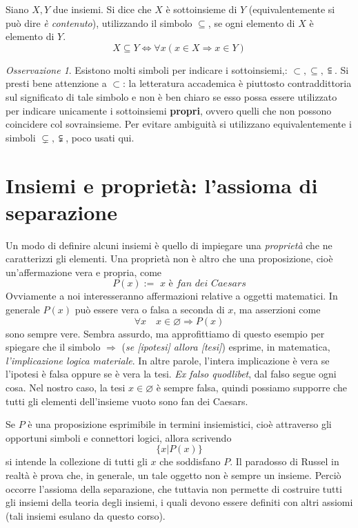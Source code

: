 \documentclass[oneside]{book}
\theoremstyle{remark}
\newtheorem*{osservaz}{Osservazione}
\begin{document}
\begin{tcolorbox}[colback=yellow!30, colframe=yellow!30!black, title={Sottoinsiemi}]
Siano $X,Y$ due insiemi. Si dice che $X$ è sottoinsieme di $Y$
(equivalentemente si può dire \emph{è contenuto}), utilizzando il simbolo $\subseteq$,
se ogni elemento di $X$ è elemento di $Y$.
\[ X \subseteq Y \Longleftrightarrow \forall x(x\in X \Rightarrow x\in Y) \]
\end{tcolorbox}

\begin{osservaz}
Esistono molti simboli per indicare i
sottoinsiemi,: $\subset,\subseteq,\subseteqq$.
Si presti bene attenzione a $\subset$: la letteratura
accademica è piuttosto contraddittoria sul significato di tale
simbolo e non è ben chiaro se esso possa essere utilizzato per
indicare unicamente i sottoinsiemi \textbf{propri}, ovvero quelli
che non possono coincidere col sovrainsieme. Per evitare
ambiguità si utilizzano equivalentemente i simboli $\subsetneq,\subsetneqq$, poco usati
qui.
\end{osservaz}

\section{Insiemi e proprietà: l'assioma di separazione}
Un modo di definire alcuni insiemi è quello di impiegare una \textit{proprietà}
che ne caratterizzi gli elementi. Una proprietà non è altro che una proposizione,
cioè un'affermazione vera e propria, come
\[ P(x) := \textit{ x è fan dei Caesars} \]
Ovviamente a noi interesseranno affermazioni relative a oggetti matematici.
In generale $P(x)$ può essere vera o falsa a seconda di $x$, ma asserzioni come
\[ \forall x \quad x\in\varnothing\Longrightarrow P(x) \]
sono sempre vere. Sembra assurdo, ma approfittiamo di questo esempio per
spiegare che il simbolo $\Longrightarrow$ (\textit{se [ipotesi] allora [tesi]}) esprime, in matematica, \textit{l'implicazione logica materiale}.
In altre parole, l'intera implicazione è vera se l'ipotesi è falsa oppure se
è vera la tesi. \textit{Ex falso quodlibet}, dal falso segue ogni cosa. Nel
nostro caso, la tesi $x\in\varnothing$ è sempre falsa, quindi possiamo
supporre che tutti gli elementi dell'insieme vuoto sono fan dei Caesars.


Se $P$ è una proposizione esprimibile
in termini insiemistici, cioè attraverso gli opportuni simboli e connettori
logici, allora scrivendo
\[\{x|P(x)\}\]
si intende la collezione di tutti gli $x$ che soddisfano $P$. Il paradosso
di Russel in realtà è prova che, in generale, un tale oggetto non è
sempre un insieme. Perciò occorre l'assioma della separazione, che tuttavia
non permette di costruire tutti gli insiemi della teoria degli insiemi, i
quali devono essere definiti con altri assiomi
(tali insiemi esulano da questo corso).
\end{document}

